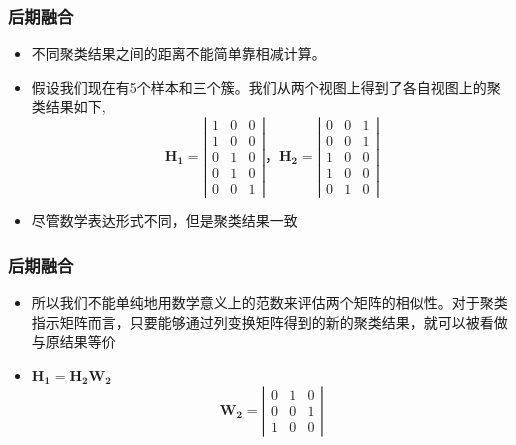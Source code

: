 \begin{frame}
    \frametitle{后期融合}
    \begin{itemize}
        \item 不同聚类结果之间的距离不能简单靠相减计算。
        \item 假设我们现在有5个样本和三个簇。我们从两个视图上得到了各自视图上的聚类结果如下,
\[
\mathbf{H_{1}} = \left|\begin{array}{cccc}
    1 &    0    & 0 \\
    1 &    0   & 0\\
    0 &    1   & 0 \\
    0 &    1   & 0 \\
    0 &    0   & 1
\end{array}\right|，
 \mathbf{H_{2}} = \left|\begin{array}{cccc}
    0 &    0    & 1 \\
    0 &    0   &  1\\
    1 &    0   &  0\\
    1 &    0   &  0\\
    0 &    1   &  0
\end{array}\right|
\]   
       \item 尽管数学表达形式不同，但是聚类结果一致
    \end{itemize}      
\end{frame}

\begin{frame}
    \frametitle{后期融合}
    \begin{itemize}
        \item 所以我们不能单纯地用数学意义上的范数来评估两个矩阵的相似性。对于聚类指示矩阵而言，只要能够通过列变换矩阵得到的新的聚类结果，就可以被看做与原结果等价
        \item $\mathbf{H_1} = \mathbf{H_2}\mathbf{W_2}$ 
\[
\mathbf{W_{2}} = \left|\begin{array}{cccc}
    0 &    1    & 0 \\
    0 &    0   & 1\\
    1 &    0   & 0
\end{array}\right|
\]      
    \end{itemize}      
\end{frame}

